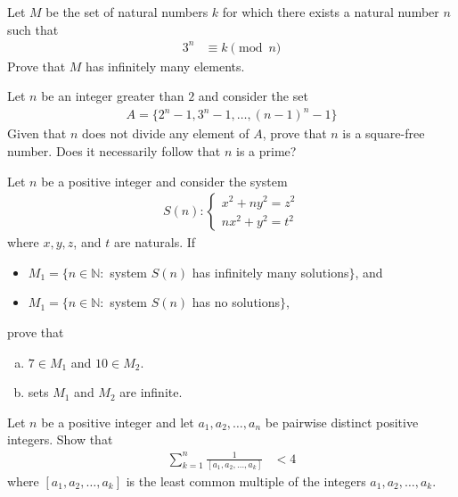 \documentclass[problems.tex]{subfile}
\begin{document}
	\begin{problem}
		Let $M$ be the set of natural numbers $k$ for which there exists a natural number $n$ such that
			\begin{align*}
				3^n
					& \equiv k\pmod n
			\end{align*}
		Prove that $M$ has infinitely many elements. %
	\end{problem}

	\begin{problem}
		Let $n$ be an integer greater than $2$ and consider the set
		\begin{align*}
			A = \{2^n-1,3^n-1,\dots,(n-1)^n-1\}
		\end{align*}
		Given that $n$ does not divide any element of $A$, prove that $n$ is a square-free number. Does it necessarily follow that $n$ is a prime? %
	\end{problem}

	\begin{problem}
		Let $n$ be a positive integer and consider the system
		\begin{align*}
			S(n):\begin{cases}
				x^2+ny^2=z^2\\
				nx^2+y^2=t^2
			\end{cases}
		\end{align*}
		where $x,y,z$, and $t$ are naturals. If
		\begin{itemize}
			\item $M_1=\{n\in\mathbb N:$ system $S(n)$ has infinitely many solutions$\}$, and
			\item $M_1=\{n\in\mathbb N:$ system $S(n)$ has no solutions$\}$,
		\end{itemize}
		prove that
		\begin{enumerate}[(a)]
			\item $7 \in M_1$ and $10 \in M_2$.
			\item sets $M_1$ and $M_2$ are infinite.
		\end{enumerate}
	\end{problem}

	\begin{problem}
		Let $n$ be a positive integer and let $a_1, a_2, \dots, a_n$ be pairwise distinct positive integers. Show that
		\begin{align*}
			\sum_{k=1}^{n} \frac{1}{[a_1, a_2, \dots, a_k]}
				& < 4
		\end{align*}
		where $[a_1, a_2, \dots, a_k]$ is the least common multiple of the integers $a_1, a_2, \dots, a_k$.
	\end{problem}
\end{document}
